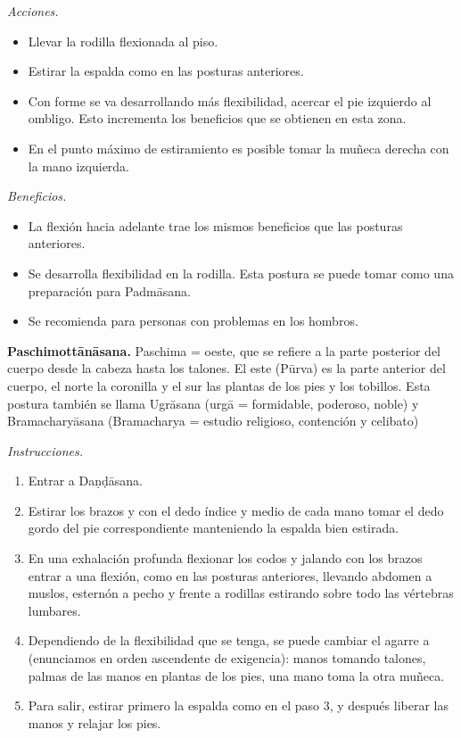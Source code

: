 \emph{Acciones.}
\begin{itemize}
\item Llevar la rodilla flexionada al piso.
\item Estirar la espalda como en las posturas
anteriores.
\item Con forme se va desarrollando más
flexibilidad, acercar el pie izquierdo al
ombligo. Esto incrementa los beneficios que
se obtienen en esta zona.
\item En el punto máximo de estiramiento es
posible tomar la muñeca derecha con la mano
izquierda.
\end{itemize}

\emph{Beneficios.}
\begin{itemize}
\item La flexión hacia adelante trae los
mismos beneficios que las posturas
anteriores.
\item Se desarrolla flexibilidad en la
rodilla. Esta postura se puede tomar como una
preparación para Padmāsana.
\item Se recomienda para personas con
problemas en los hombros.
\end{itemize}

\medskip\noindent\textbf{Paschimottānāsana.}
Paschima = oeste, que se refiere a la parte
posterior del cuerpo desde la cabeza hasta
los talones. El este (Pūrva) es la parte
anterior del cuerpo, el norte la coronilla y
el sur las plantas de los pies y los
tobillos. Esta postura también se llama
Ugrāsana (urgā = formidable, poderoso, noble)
y Bramacharyāsana (Bramacharya = estudio
religioso, contención y celibato)

\emph{Instrucciones.}
\begin{enumerate}
\item Entrar a Daṇḍāsana.
\item Estirar los brazos y con el dedo índice
y medio de cada mano tomar el dedo gordo del
pie correspondiente manteniendo la espalda
bien estirada.
\item En una exhalación profunda flexionar
los codos y jalando con los brazos entrar a
una flexión, como en las posturas anteriores,
llevando abdomen a muslos, esternón a pecho y
frente a rodillas estirando sobre todo las
vértebras lumbares.
\item Dependiendo de la flexibilidad que se
tenga, se puede cambiar el agarre a
(enunciamos en orden ascendente de
exigencia): manos tomando talones, palmas de
las manos en plantas de los pies, una mano
toma la otra muñeca.
\item Para salir, estirar primero la espalda
como en el paso 3, y después liberar las
manos y relajar los pies.
\end{enumerate}

